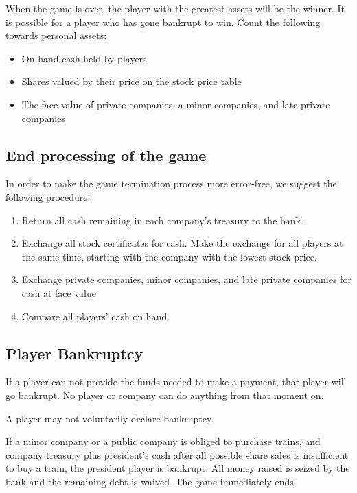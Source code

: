 \documentclass{article}
\begin{document}
\begin{CJK}{UTF8}{min}
\begin{multicols}{2}
When the game is over, the player with the greatest assets will be the
winner. It is possible for a player who has gone bankrupt to
win. Count the following towards personal assets:

\begin{itemize}
\item On-hand cash held by players
\item Shares valued by their price on the stock price table
\item The face value of private companies, a minor companies, and late
  private companies
\end{itemize}

\subsection{End processing of the game}

In order to make the game termination process more error-free, we suggest
the following procedure:

\begin{enumerate}
\item Return all cash remaining in each company's treasury to the bank.
\item Exchange all stock certificates for cash. Make the exchange for
  all players at the same time, starting with the company with the
  lowest stock price.
\item Exchange private companies, minor companies, and late private companies
  for cash at face value
\item Compare all players' cash on hand.
\end{enumerate}

\subsection{Player Bankruptcy}
\label{endgame-player-bankruptcy}
If a player can not provide the funds needed to make a payment, that
player will go bankrupt. No player or company can do anything from
that moment on.

A player may not voluntarily declare bankruptcy.

If a minor company or a public company is obliged to purchase trains,
and company treasury plus president's cash after all possible share
sales is insufficient to buy a train, the president player is
bankrupt. All money raised is seized by the bank and the remaining
debt is waived. The game immediately ends.


\end{multicols}
\end{CJK}
\end{document}
